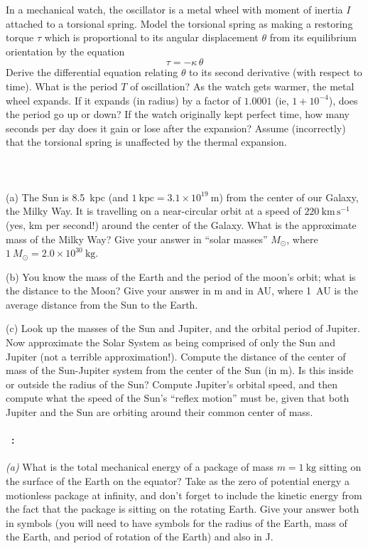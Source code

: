 \documentclass[12pt]{article}
\newcounter{problem}
\begin{document}
In a mechanical watch, the oscillator is a metal wheel with moment of
inertia $I$ attached to a torsional spring.  Model the torsional
spring as making a restoring torque $\tau$ which is proportional to
its angular displacement $\theta$ from its equilibrium orientation by
the equation
\begin{equation}
\tau = -\kappa\,\theta \nonumber
\end{equation}
Derive the differential equation relating $\theta$ to its second
derivative (with respect to time).  What is the period $T$ of
oscillation?  As the watch gets warmer, the metal wheel expands.  If
it expands (in radius) by a factor of $1.0001$ (ie, $1+10^{-4}$), does
the period go up or down?  If the watch originally kept perfect time,
how many seconds per day does it gain or lose after the expansion?
Assume (incorrectly) that the torsional spring is unaffected by the
thermal expansion.

\paragraph{\problemname~\theproblem}

(a) The Sun is 8.5~kpc (and $1~\mathrm{kpc}=3.1\times
10^{19}~\mathrm{m}$) from the center of our Galaxy, the Milky Way.  It
is travelling on a near-circular orbit at a speed of
$220~\mathrm{km\,s^{-1}}$ (yes, km per second!) around the center of
the Galaxy.  What is the approximate mass of the Milky Way?  Give your
answer in ``solar masses'' $M_\odot$, where $1~M_\odot= 2.0\times
10^{30}~\mathrm{kg}$.

(b) You know the mass of the Earth and the period of the moon's orbit;
what is the distance to the Moon?  Give your answer in m and in AU,
where 1~AU is the average distance from the Sun to the Earth.

(c) Look up the masses of the Sun and Jupiter, and the orbital period
of Jupiter.  Now approximate the Solar System as being comprised of
only the Sun and Jupiter (not a terrible approximation!).  Compute the
distance of the center of mass of the Sun-Jupiter system from the
center of the Sun (in m).  Is this inside or outside the radius of the
Sun?  Compute Jupiter's orbital speed, and then compute what the speed
of the Sun's ``reflex motion'' must be, given that both Jupiter and
the Sun are orbiting around their common center of mass.

\paragraph{\problemname~\theproblem:}%
\textsl{(a)} What is the total mechanical energy of a package of mass
$m= 1~\mathrm{kg}$ sitting on the surface of the Earth on the equator?
Take as the zero of potential energy a motionless package at infinity,
and don't forget to include the kinetic energy from the fact that the
package is sitting on the rotating Earth.  Give your answer both in
symbols (you will need to have symbols for the radius of the Earth,
mass of the Earth, and period of rotation of the Earth) and also in J.
\end{document}
